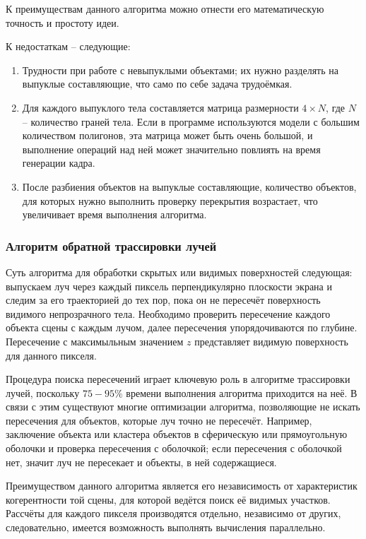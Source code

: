 К преимуществам данного алгоритма можно отнести его математическую точность и
простоту идеи. \cite[с.~250]{rogers}

К недостаткам -- следующие:\begin{enumerate}
    \item Трудности при работе с невыпуклыми объектами; их нужно разделять на
        выпуклые составляющие, что само по себе задача трудоёмкая.
    \item Для каждого выпуклого тела составляется матрица размерности $4 \times
        N$, где $N$ -- количество граней тела. Если в программе используются
        модели с большим количеством полигонов, эта матрица может быть очень
        большой, и выполнение операций над ней может значительно повлиять на
        время генерации кадра.
    \item После разбиения объектов на выпуклые составляющие, количество
        объектов, для которых нужно выполнить проверку перекрытия возрастает,
        что увеличивает время выполнения алгоритма.
\end{enumerate}

\subsubsection{Алгоритм обратной трассировки лучей}

Суть алгоритма для обработки скрытых или видимых поверхностей следующая:
выпускаем луч через каждый пиксель перпендикулярно плоскости экрана и следим за
его траекторией до тех пор, пока он не пересечёт поверхность видимого
непрозрачного тела. Необходимо проверить пересечение каждого объекта сцены с
каждым лучом, далее пересечения упорядочиваются по глубине. Пересечение с
максимыльным значением $z$ представляет видимую поверхность для данного
пикселя. \cite[с.~362]{rogers}

Процедура поиска пересечений играет ключевую роль в алгоритме трассировки
лучей, поскольку $75-95\%$ времени выполнения алгоритма приходится на неё. В
связи с этим существуют многие оптимизации алгоритма, позволяющие не искать
пересечения для объектов, которые луч точно не пересечёт. Например, заключение
объекта или кластера объектов в сферическую или прямоугольную оболочки и
проверка пересечения с оболочкой; если пересечения с оболочкой нет, значит луч
не пересекает и объекты, в ней содержащиеся. \cite[с.~363]{rogers}

Преимуществом данного алгоритма является его независимость от характеристик
когерентности той сцены, для которой ведётся поиск её видимых участков.
Рассчёты для каждого пикселя производятся отдельно, независимо от других,
следовательно, имеется возможность выполнять вычисления параллельно.

